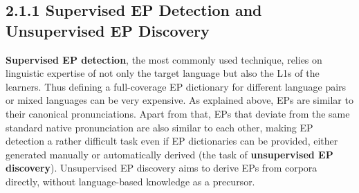 \documentclass[nobib]{tufte-handout}
\begin{document}
\subsection{2.1.1 \textbf{Supervised EP Detection and Unsupervised EP Discovery}}
\textbf{Supervised EP detection}, the most commonly used technique, relies on linguistic expertise of not only the target language but also the L1s of the learners. Thus defining a full-coverage EP dictionary for different language pairs or mixed languages can be very expensive. As explained above, EPs are similar to their canonical pronunciations. Apart from that, EPs that deviate from the same standard native pronunciation are also similar to each other, making EP detection a rather difficult task even if EP dictionaries can be provided, either generated manually or automatically derived (the task of \textbf{unsupervised EP discovery}). Unsupervised EP discovery aims to derive EPs from corpora directly, without language-based knowledge as a precursor. \\
\end{document}

